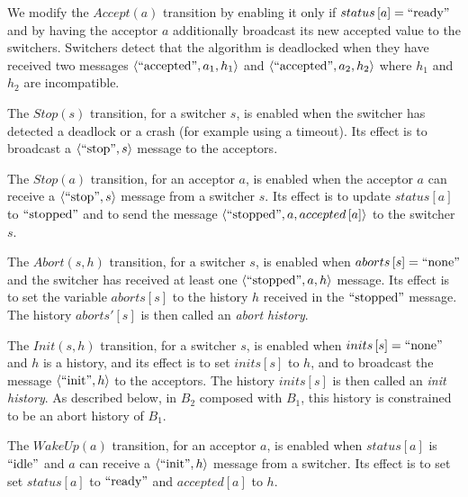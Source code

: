 \documentclass{llncs}
\begin{document}
\begin{compactitem}
\item We modify the $Accept\left( a \right)$ transition by enabling it only if $status\left[ a \right] = \text{``ready''}$ and by having the acceptor $a$ additionally broadcast its new accepted value to the switchers.
Switchers detect that the algorithm is deadlocked when they have received two messages $\left\langle\text{``accepted''}, a_1, h_1\right\rangle$ and $\left\langle\text{``accepted''}, a_2, h_2\right\rangle$ where  $h_1$ and $h_2$ are incompatible.

\item The $Stop\left( s \right)$ transition, for a switcher $s$, is enabled when the switcher has detected a deadlock or a crash (for example using a timeout). Its effect is to broadcast a $\left\langle\text{``stop''}, s\right\rangle$ message to the acceptors.

\item The $Stop\left( a \right)$ transition, for an acceptor $a$, is enabled when the acceptor $a$ can receive a $\left\langle\text{``stop''}, s\right\rangle$ message from a switcher $s$.
  Its effect is to update $status\left[ a \right]$ to $\text{``stopped''}$ and to send the message $\left\langle\text{``stopped''},a,accepted\left[ a \right]\right\rangle$ to the switcher $s$.

\item The $Abort\left( s, h\right)$ transition, for a switcher $s$, is enabled when $aborts\left[ s \right] = \text{``none''}$ and the switcher has received
  at least one $\left\langle\text{``stopped''}, a, h\right\rangle$ message. Its effect is to set the variable $aborts\left[ s \right]$ to the history $h$ received in the $\text{``stopped''}$ message. The history $aborts'\left[ s \right]$ is then called an \emph{abort history}. 

\item The $Init\left( s,h \right)$ transition, for a switcher $s$, is enabled when $inits\left[ s \right]=\text{``none''}$ and $h$ is a history, and its effect is to set $inits\left[ s \right]$ to $h$, and to broadcast the message $\left\langle\text{``init''}, h\right\rangle$ to the acceptors.  The history $inits\left[ s \right]$ is then called an \emph{init history}.
As described below, in $B_2$ composed with $B_1$, this history is constrained to be an abort history of $B_1$.

 \item The $WakeUp\left( a \right)$ transition, for an acceptor $a$, is enabled when $status\left[ a \right]$ is $\text{``idle''}$ and $a$ can receive a $\left\langle\text{``init''}, h\right\rangle$ message from a switcher. Its effect is to set set $status\left[ a \right]$ to $\text{``ready''}$ and $accepted\left[ a \right]$ to $h$.

\end{compactitem}
\end{document}

